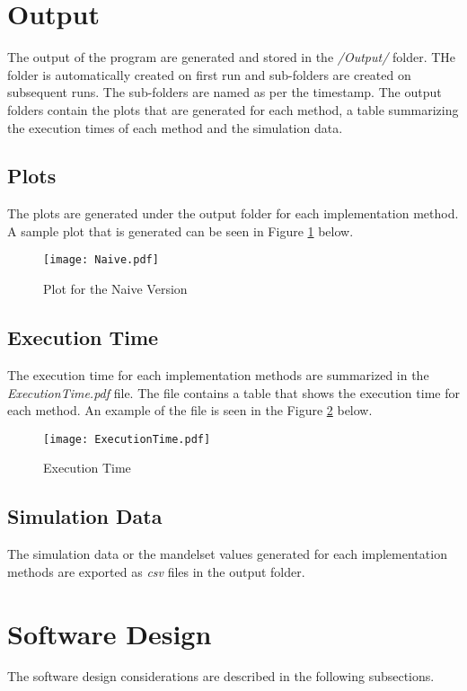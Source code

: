 \documentclass{article}
\begin{document}
\section{Output}
The output of the program are generated and stored in the \textit{/Output/} folder. THe folder is automatically created on first run and sub-folders are created on subsequent runs. The sub-folders are named as per the timestamp. The output folders contain the plots that are generated for each method, a table summarizing the execution times of each method and the simulation data. 

\subsection{Plots}
The plots are generated under the output folder for each implementation method. A sample plot that is generated can be seen in Figure \ref{fig:plot} below. 

\begin{figure}[h!]
    \centering
    \texttt{[image: Naive.pdf]}
    \caption{Plot for the Naive Version}
    \label{fig:plot}
\end{figure}


\subsection{Execution Time}
The execution time for each implementation methods are summarized in the \textit{ExecutionTime.pdf} file. The file contains a table that shows the execution time for each method. An example of the file is seen in the Figure \ref{fig:exec} below.

\begin{figure}[h!]
    \centering
    \texttt{[image: ExecutionTime.pdf]}
    \caption[scale=0.5]{Execution Time}
    \label{fig:exec}
\end{figure}


\subsection{Simulation Data}
The simulation data or the mandelset values generated for each implementation methods are exported as \textit{csv} files in the output folder. 

\section{Software Design}
The software design considerations are described in the following subsections.
\end{document}
